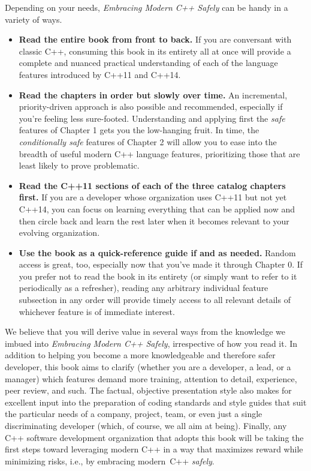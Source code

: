 Depending on your needs, \textit{Embracing Modern C++ Safely} can be handy in a variety of ways.
\begin{itemize}
\item{\textbf{Read the entire book from front to back.} If you are conversant with classic C++, consuming this book in its entirety all at once will provide a complete and nuanced practical understanding of each of the language features introduced by C++11 and C++14.}
\item{\textbf{Read the chapters in order but slowly over time.} An incremental, priority-driven approach is also possible and recommended, especially if you're feeling less sure-footed. Understanding and applying first the \emph{safe} features of Chapter 1 gets you the low-hanging fruit. In time, the \emph{conditionally safe} features of Chapter 2 will allow you to ease into the breadth of useful modern C++ language features, prioritizing those that are least likely to prove problematic.}
\item{\textbf{Read the C++11 sections of each of the three catalog chapters first.} If you are a developer whose organization uses C++11 but not yet C++14, you can focus on learning everything that can be applied now and then circle back and learn the rest later when it becomes relevant to your evolving organization.}
\item{\textbf{Use the book as a quick-reference guide if and as needed.} Random access is great, too, especially now that you've made it through Chapter 0. If you prefer not to read the book in its entirety (or simply want to refer to it periodically as a refresher), reading any arbitrary individual feature subsection in any order will provide timely access to all relevant details of whichever feature is of immediate interest.}
\end{itemize}

We believe that you will derive value in several ways from the knowledge we imbued into \textit{Embracing Modern C++ Safely}, irrespective of how you read it. In addition to helping you become a more knowledgeable and therefore safer developer, this book aims to clarify (whether you are a developer, a lead, or a manager) which features demand more training, attention to detail, experience, peer review, and such. The factual, objective presentation style also makes for excellent input into the preparation of coding standards and style guides that suit the particular needs of a company, project, team, or even just a single discriminating developer (which, of course, we all aim at being). Finally, any C++ software development organization that adopts this book will be taking the first steps toward leveraging modern C++ in a way that maximizes reward while minimizing risks, i.e., by embracing modern~C++ \emph{safely}. 

